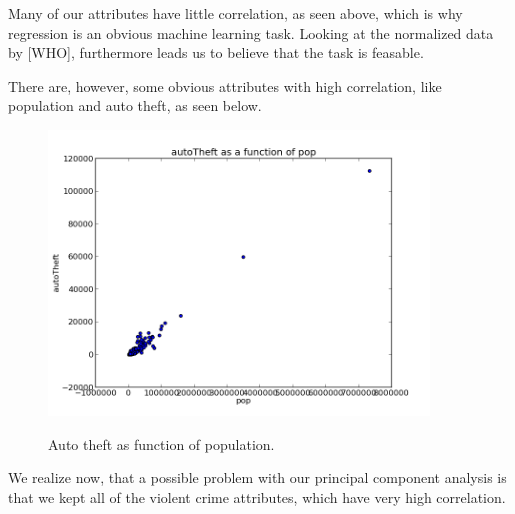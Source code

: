 Many of our attributes have little correlation, as seen above, which is why regression is an obvious machine learning task. Looking at the normalized data by [WHO], furthermore leads us to believe that the task is feasable.

There are, however, some obvious attributes with high correlation, like population and auto theft, as seen below.

\begin{figure}[H]
\centering
\includegraphics[width=0.9\textwidth]{correlations/autoTheft-as-func-of-pop}
\label{fig:prenorm_attrrem_0out}
\caption{Auto theft as function of population.}
\end{figure}

We realize now, that a possible problem with our principal component analysis is that we kept all of the violent crime attributes, which have very high correlation.
